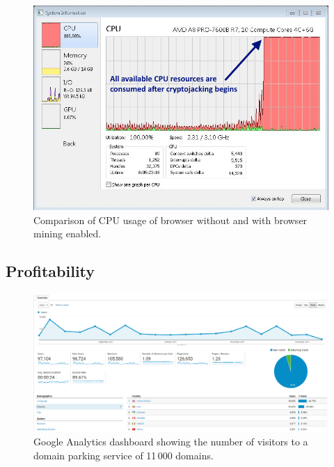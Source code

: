 \begin{figure}[h]
\centering
\includegraphics[width=\linewidth]{figures/windows_cpu_usage.png}
	\caption{Comparison of CPU usage of browser without and with browser mining enabled.}\label{fig:cpu}
\end{figure}


\subsection{Profitability}
\label{profitabilitexperiment}

\begin{figure}[t]
\centering
\includegraphics[width=\linewidth]{figures/experiment_analytics_results.png}
\caption{Google Analytics dashboard showing the number of visitors to a domain parking service of 11\,000 domains.}\label{fig:domain2}
\end{figure}


